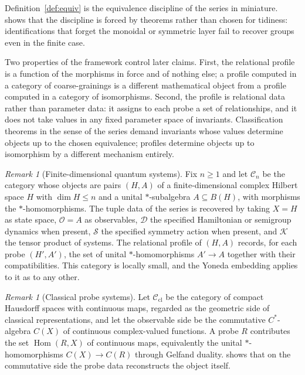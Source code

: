\documentclass[11pt,letterpaper]{article}
\DeclareMathOperator{\Hom}{Hom}
\theoremstyle{definition}
\theoremstyle{remark}
\newtheorem{remark}[theorem]{Remark}
\begin{document}
Definition~\ref{def:equiv} is the equivalence discipline of the series in miniature.  shows that the discipline is forced by theorems rather than chosen for tidiness: identifications that forget the monoidal or symmetric layer fail to recover groups even in the finite case.

Two properties of the framework control later claims. First, the relational profile is a function of the morphisms in force and of nothing else; a profile computed in a category of coarse-grainings is a different mathematical object from a profile computed in a category of isomorphisms. Second, the profile is relational data rather than parameter data: it assigns to each probe a set of relationships, and it does not take values in any fixed parameter space of invariants. Classification theorems in the sense of the series demand invariants whose values determine objects up to the chosen equivalence; profiles determine objects up to isomorphism by a different mechanism entirely.

\begin{remark}[Finite-dimensional quantum systems]
\label{ex:quantum}
Fix $n \geq 1$ and let $\mathcal{C}_n$ be the category whose objects are pairs $(H, A)$ of a finite-dimensional complex Hilbert space $H$ with $\dim H \leq n$ and a unital $*$-subalgebra $A \subseteq B(H)$, with morphisms the $*$-homomorphisms. The tuple data of the series is recovered by taking $X = H$ as state space, $\mathcal{O} = A$ as observables, $\mathcal{D}$ the specified Hamiltonian or semigroup dynamics when present, $\mathcal{S}$ the specified symmetry action when present, and $\mathcal{K}$ the tensor product of systems. The relational profile of $(H, A)$ records, for each probe $(H', A')$, the set of unital $*$-homomorphisms $A' \to A$ together with their compatibilities. This category is locally small, and the Yoneda embedding applies to it as to any other.
\end{remark}

\begin{remark}[Classical probe systems]
\label{ex:classical}
Let $\mathcal{C}_{\mathrm{cl}}$ be the category of compact Hausdorff spaces with continuous maps, regarded as the geometric side of classical representations, and let the observable side be the commutative $C^*$-algebra $C(X)$ of continuous complex-valued functions. A probe $R$ contributes the set $\Hom(R, X)$ of continuous maps, equivalently the unital $*$-homomorphisms $C(X) \to C(R)$ through Gelfand duality.  shows that on the commutative side the probe data reconstructs the object itself.
\end{remark}
\end{document}
